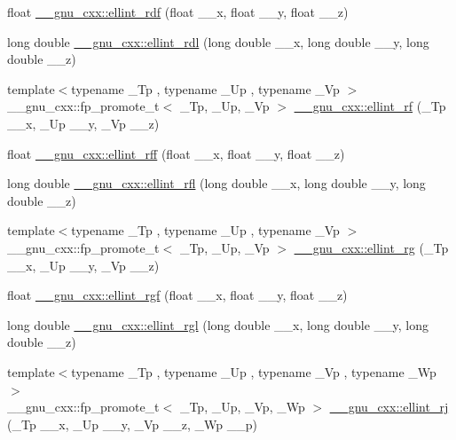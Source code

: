 \begin{DoxyCompactItemize}
\item 
float \hyperlink{group__mathsf__gnu_ga52e7cc797b9d199b7468cdbec6505357}{\+\_\+\+\_\+gnu\+\_\+cxx\+::ellint\+\_\+rdf} (float \+\_\+\+\_\+x, float \+\_\+\+\_\+y, float \+\_\+\+\_\+z)
\item 
long double \hyperlink{group__mathsf__gnu_ga68a38a5f320a7184cec4b120ddef6a65}{\+\_\+\+\_\+gnu\+\_\+cxx\+::ellint\+\_\+rdl} (long double \+\_\+\+\_\+x, long double \+\_\+\+\_\+y, long double \+\_\+\+\_\+z)
\item 
{\footnotesize template$<$typename \+\_\+\+Tp , typename \+\_\+\+Up , typename \+\_\+\+Vp $>$ }\\\+\_\+\+\_\+gnu\+\_\+cxx\+::fp\+\_\+promote\+\_\+t$<$ \+\_\+\+Tp, \+\_\+\+Up, \+\_\+\+Vp $>$ \hyperlink{group__mathsf__gnu_gae4859494464c7eaf98193f92b2235bc1}{\+\_\+\+\_\+gnu\+\_\+cxx\+::ellint\+\_\+rf} (\+\_\+\+Tp \+\_\+\+\_\+x, \+\_\+\+Up \+\_\+\+\_\+y, \+\_\+\+Vp \+\_\+\+\_\+z)
\item 
float \hyperlink{group__mathsf__gnu_ga39acf5c69a85f9b687478b32847156da}{\+\_\+\+\_\+gnu\+\_\+cxx\+::ellint\+\_\+rff} (float \+\_\+\+\_\+x, float \+\_\+\+\_\+y, float \+\_\+\+\_\+z)
\item 
long double \hyperlink{group__mathsf__gnu_ga38dd36b3db5bbe5da516d0cbe3ff1f21}{\+\_\+\+\_\+gnu\+\_\+cxx\+::ellint\+\_\+rfl} (long double \+\_\+\+\_\+x, long double \+\_\+\+\_\+y, long double \+\_\+\+\_\+z)
\item 
{\footnotesize template$<$typename \+\_\+\+Tp , typename \+\_\+\+Up , typename \+\_\+\+Vp $>$ }\\\+\_\+\+\_\+gnu\+\_\+cxx\+::fp\+\_\+promote\+\_\+t$<$ \+\_\+\+Tp, \+\_\+\+Up, \+\_\+\+Vp $>$ \hyperlink{group__mathsf__gnu_gadf618529d6106c1c1bc1e9212c4fed12}{\+\_\+\+\_\+gnu\+\_\+cxx\+::ellint\+\_\+rg} (\+\_\+\+Tp \+\_\+\+\_\+x, \+\_\+\+Up \+\_\+\+\_\+y, \+\_\+\+Vp \+\_\+\+\_\+z)
\item 
float \hyperlink{group__mathsf__gnu_ga7a4ab348bf312a3425501ac8a3d16494}{\+\_\+\+\_\+gnu\+\_\+cxx\+::ellint\+\_\+rgf} (float \+\_\+\+\_\+x, float \+\_\+\+\_\+y, float \+\_\+\+\_\+z)
\item 
long double \hyperlink{group__mathsf__gnu_ga563455d515ed845988552432108a21be}{\+\_\+\+\_\+gnu\+\_\+cxx\+::ellint\+\_\+rgl} (long double \+\_\+\+\_\+x, long double \+\_\+\+\_\+y, long double \+\_\+\+\_\+z)
\item 
{\footnotesize template$<$typename \+\_\+\+Tp , typename \+\_\+\+Up , typename \+\_\+\+Vp , typename \+\_\+\+Wp $>$ }\\\+\_\+\+\_\+gnu\+\_\+cxx\+::fp\+\_\+promote\+\_\+t$<$ \+\_\+\+Tp, \+\_\+\+Up, \+\_\+\+Vp, \+\_\+\+Wp $>$ \hyperlink{group__mathsf__gnu_gadccabc8df929cc03745286ed1574a3ba}{\+\_\+\+\_\+gnu\+\_\+cxx\+::ellint\+\_\+rj} (\+\_\+\+Tp \+\_\+\+\_\+x, \+\_\+\+Up \+\_\+\+\_\+y, \+\_\+\+Vp \+\_\+\+\_\+z, \+\_\+\+Wp \+\_\+\+\_\+p)

\end{DoxyCompactItemize}
